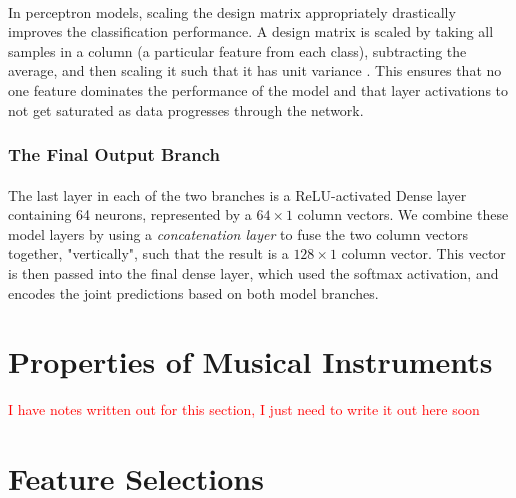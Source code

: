 \documentclass[12pt,letterpaper]{article}
\begin{document}
\paragraph*{}In perceptron models, scaling the design matrix appropriately drastically improves the classification performance. A design matrix is scaled by taking all samples in a column (a particular feature from each class), subtracting the average, and then scaling it such that it has unit variance \cite{Geron,James}. This ensures that no one feature dominates the performance of the model and that layer activations to not get saturated as data progresses through the network.


\subsubsection{The Final Output Branch}

\paragraph*{}The last layer in each of the two branches is a ReLU-activated Dense layer containing 64 neurons, represented by a $64 \times 1$ column vectors. We combine these model layers by using a \textit{concatenation layer} to fuse the two column vectors together, "vertically", such that the result is a $128 \times 1$ column vector. This vector is then passed into the final dense layer, which used the softmax activation, and encodes the joint predictions based on both model branches. 


\newpage
\section{Properties of Musical Instruments}
\label{sec-Instruments}

\textcolor{red}{I have notes written out for this section, I just need to write it out here soon}


\newpage
\section{Feature Selections}
\label{sec-Features}
\end{document}
